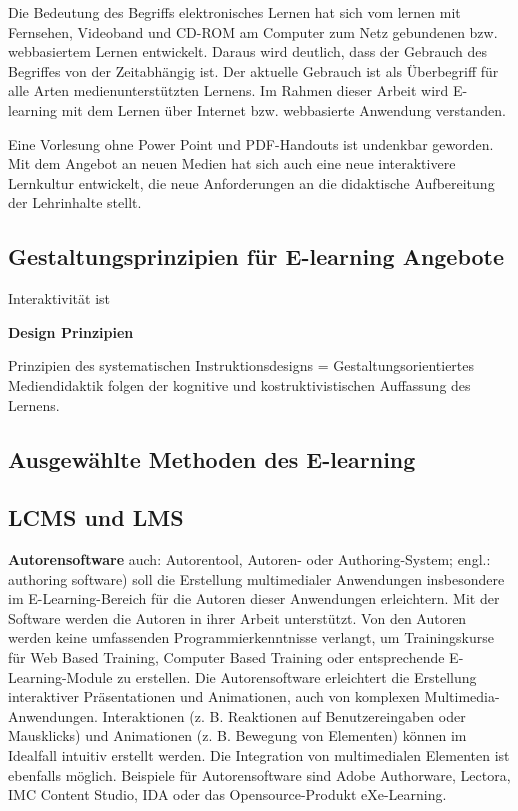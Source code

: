 \documentclass[a4paper, 12pt, twoside, BCOR=20mm, DIV=calc, abstracton, parskip=half*, toc=bibliography, toc=listof, headsepline, footsepline, headings=small, numbers=enddot]{scrreprt}
\begin{document}
Die Bedeutung des Begriffs elektronisches Lernen hat sich vom lernen mit Fernsehen, Videoband und CD-ROM am Computer zum Netz gebundenen bzw. webbasiertem Lernen entwickelt. 
Daraus wird deutlich, dass der Gebrauch des Begriffes von der Zeitabhängig ist. Der aktuelle Gebrauch ist als Überbegriff für alle Arten medienunterstützten Lernens.\cite[S.22 ff.]{baumgartner2002learning} Im Rahmen dieser Arbeit wird E-learning mit dem Lernen über Internet bzw. webbasierte Anwendung verstanden. 

 
Eine Vorlesung ohne Power Point und PDF-Handouts ist undenkbar geworden. Mit dem Angebot an neuen Medien hat sich auch eine neue interaktivere Lernkultur entwickelt, die neue Anforderungen an die didaktische Aufbereitung der Lehrinhalte stellt. 

\subsection{Gestaltungsprinzipien für E-learning Angebote}

Interaktivität ist 

\textbf{Design Prinzipien}

Prinzipien des systematischen Instruktionsdesigns = Gestaltungsorientiertes Mediendidaktik
folgen der kognitive und kostruktivistischen Auffassung des Lernens. 

\subsection{Ausgewählte Methoden des E-learning}



\subsection{\ac{LCMS} und \ac{LMS}}

\textbf{Autorensoftware} auch: Autorentool, Autoren- oder Authoring-System; engl.: authoring software) soll die Erstellung multimedialer Anwendungen insbesondere im E-Learning-Bereich für die Autoren dieser Anwendungen erleichtern.
Mit der Software werden die Autoren in ihrer Arbeit unterstützt. Von den Autoren werden keine umfassenden Programmierkenntnisse verlangt, um Trainingskurse für Web Based Training, Computer Based Training oder entsprechende E-Learning-Module zu erstellen.
Die Autorensoftware erleichtert die Erstellung interaktiver Präsentationen und Animationen, auch von komplexen Multimedia-Anwendungen. Interaktionen (z. B. Reaktionen auf Benutzereingaben oder Mausklicks) und Animationen (z. B. Bewegung von Elementen) können im Idealfall intuitiv erstellt werden. Die Integration von multimedialen Elementen ist ebenfalls möglich.
Beispiele für Autorensoftware sind Adobe Authorware, Lectora, IMC Content Studio, IDA oder das Opensource-Produkt eXe-Learning. %
\end{document}
